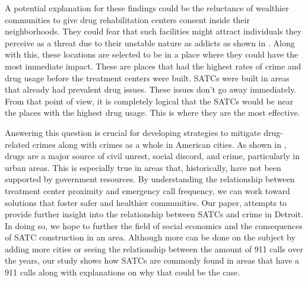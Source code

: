 \documentclass[12pt]{article}
\begin{document}
A potential explanation for these findings could be the reluctance of wealthier communities to give drug rehabilitation centers consent inside their neighborhoods. They could fear that such facilities might attract individuals they perceive as a threat due to their unstable nature as addicts as shown in \cite{mental_health_and_disability}.  Along with this, these locations are selected to be in a place where they could have the most immediate impact. These are places that had the highest rates of crime and drug usage before the treatment centers were built. SATCs were built in areas that already had prevalent drug issues. These issues don't go away immediately.  From that point of view, it is completely logical that the SATCs would be near the places with the highest drug usage. This is where they are the most effective. 

Answering this question is crucial for developing strategies to mitigate drug-related crimes along with crimes as a whole in American cities. As shown in \cite{SAT_centers_and_crime}, drugs are a major source of civil unrest, social discord, and crime, particularly in urban areas. This is especially true in areas that, historically, have not been supported by government resources. By understanding the relationship between treatment center proximity and emergency call frequency, we can work toward solutions that foster safer and healthier communities. Our paper, attempts to provide further insight into the relationship between SATCs and crime in Detroit. In doing so, we hope to further the field of social economics and the consequences of SATC construction in an area. Although more can be done on the subject by adding more cities or seeing the relationship between the amount of 911 calls over the years, our study shows how SATCs are commonly found in areas that have a 911 calls along with explanations on why that could be the case.
\end{document}
